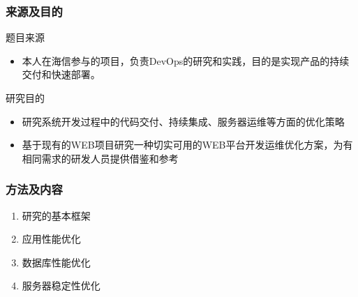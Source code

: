 \documentclass{beamer}
\begin{document}
\begin{frame}
  \frametitle{来源及目的}
  \begin{block}{题目来源}
  	\begin{itemize}
  		\item 本人在海信参与的项目，负责DevOps的研究和实践，目的是实现产品的持续交付和快速部署。
  	\end{itemize}
  \end{block}
  \begin{block}{研究目的}
  	\begin{itemize}
  		\item 研究系统开发过程中的代码交付、持续集成、服务器运维等方面的优化策略
      \item 基于现有的WEB项目研究一种切实可用的WEB平台开发运维优化方案，为有相同需求的研发人员提供借鉴和参考
  	\end{itemize}
  \end{block}
\end{frame}
\begin{frame}
  \frametitle{方法及内容}
  \begin{enumerate}
    \item<1-> 研究的基本框架
    \item<1-> 应用性能优化
    \item<1-> 数据库性能优化
    \item<1-> 服务器稳定性优化
  \end{enumerate}
\end{frame}
\end{document}

